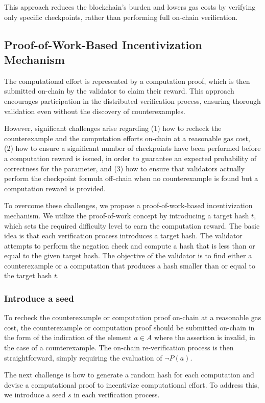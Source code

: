 \documentclass[runningheads]{llncs}
\begin{document}
This approach reduces the blockchain's burden and lowers gas costs by verifying only specific checkpoints, rather than performing full on-chain verification.
\subsection{Proof-of-Work-Based Incentivization Mechanism}
The computational effort is represented by a computation proof, which is then submitted on-chain by the validator to claim their reward. This approach encourages participation in the distributed verification process, ensuring thorough validation even without the discovery of counterexamples.

However, significant challenges arise regarding (1) how to recheck the counterexample and the computation efforts on-chain at a reasonable gas cost, (2) how to ensure a significant number of checkpoints have been performed before a computation reward is issued, in order to guarantee an expected probability of correctness for the parameter, and (3) how to ensure that validators actually perform the checkpoint formula off-chain when no counterexample is found but a computation reward is provided.

To overcome these challenges, we propose a proof-of-work-based incentivization mechanism. We utilize the proof-of-work concept by introducing a target hash \( t \), which sets the required difficulty level to earn the computation reward. The basic idea is that each verification process introduces a target hash. The validator attempts to perform the negation check and compute a hash that is less than or equal to the given target hash. The objective of the validator is to find either a counterexample or a computation that produces a hash smaller than or equal to the target hash \( t \).
\subsubsection{Introduce a seed} To recheck the counterexample or computation proof on-chain at a reasonable gas cost, the counterexample or computation proof should be submitted on-chain in the form of the indication of the element \( a \in A \) where the assertion is invalid, in the case of a counterexample. The on-chain re-verification process is then straightforward, simply requiring the evaluation of \( \neg P(a) \).

The next challenge is how to generate a random hash for each computation and devise a computational proof to incentivize computational effort. To address this, we introduce a seed \( s \) in each verification process.
\end{document}
